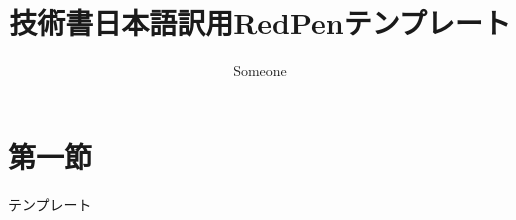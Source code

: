 \documentclass{jsarticle}
\title{技術書日本語訳用RedPenテンプレート}
\author{Someone}
\begin{document}
\maketitle
\section{第一節}

テンプレート
\end{document}
